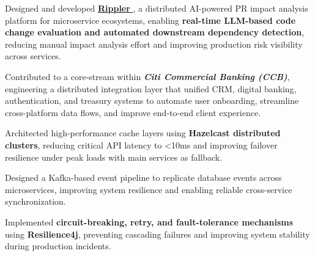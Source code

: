 \documentclass[]{hanisntsolo-resume}
\begin{document}
\begin{minipage}[t]{0.66\textwidth}
\begin{tightemize}
% 
\item Designed and developed \href{https://github.com/Citi-Rippler}{\textbf{Rippler \faExternalLink*}}, a distributed AI-powered PR impact analysis platform for microservice ecosystems, enabling \textbf{real-time LLM-based code change evaluation and automated downstream dependency detection}, reducing manual impact analysis effort and improving production risk visibility across services.

\item Contributed to a core-stream within 
\textbf{\textit{Citi Commercial Banking (CCB)}}, engineering a distributed integration layer that unified CRM, digital banking, authentication, and treasury systems to automate user onboarding, streamline cross-platform data flows, and improve end-to-end client experience.

\item Architected high-performance cache layers using \textbf{Hazelcast distributed clusters}, reducing critical API latency to <10ms and improving failover resilience under peak loads with main services as fallback.

\item Designed a Kafka-based event pipeline to replicate database events across microservices, improving system resilience and enabling reliable cross-service synchronization.

\item Implemented \textbf{circuit-breaking, retry, and fault-tolerance mechanisms} using \textbf{Resilience4j}, preventing cascading failures and improving system stability during production incidents.


\end{tightemize}
\end{minipage}
\end{document}
